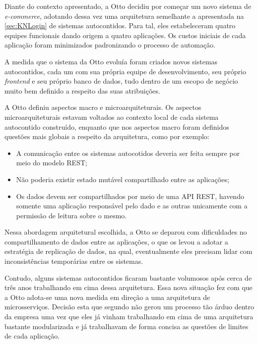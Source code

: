 Diante do contexto apresentado, a Otto decidiu por começar um novo sistema de \textit{e-commerce},
adotando dessa vez uma arquitetura semelhante a apresentada na \autoref{sec:KNLogin} de sistemas autocontidos. Para
tal, eles estabeleceram quatro equipes funcionais dando origem a quatro aplicações. Os custos
iniciais de cada aplicação foram minimizados padronizando o processo de automação.

A medida que o sistema da Otto evoluía foram criados novos sistemas autocontidos, cada um com sua própria equipe
de desenvolvimento, seu próprio \textit{frontend} e seu próprio
banco de dados, tudo dentro de um escopo de negócio muito bem definido a respeito das suas
atribuições.

A Otto definiu aspectos macro e microarquiteturais. Os aspectos
microarquiteturais estavam voltados ao contexto local de cada sistema autocontido construído,
enquanto que nos aspectos macro foram definidos questões mais globais a respeito da arquitetura, como por exemplo:

\begin{itemize}
    \item A comunicação entre os sistemas autocotidos deveria ser feita sempre por meio do modelo
        \gls{REST};
    \item Não poderia existir estado mutável compartilhado entre as aplicações;
    \item Os dados devem ser compartilhados por meio de uma \gls{API} \gls{REST}, havendo somente
        uma aplicação responsável pelo dado e as outras unicamente com a permissão de leitura sobre o
        mesmo.
\end{itemize}

Nessa abordagem arquitetural escolhida, a Otto se deparou com dificuldades no compartilhamento
de dados entre as aplicações, o que os levou a adotar a estratégia de replicação de dados, na qual,
eventualmente eles precisam lidar com inconsistências temporárias entre os sistemas.

Contudo, alguns sistemas autocontidos ficaram bastante volumosos após cerca de três anos trabalhando
em cima dessa arquitetura. Essa nova situação fez com que a Otto adota-se uma nova medida em direção
a uma arquitetura de microsserviços. Decisão esta que segundo 
não gerou um processo tão árduo dentro da empresa uma vez que eles já vinham trabalhando em cima de
uma arquitetura bastante modularizada e já trabalhavam de forma concisa as questões de limites de
cada aplicação.

